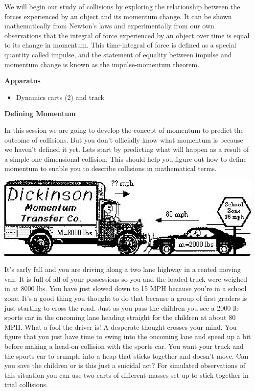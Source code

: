 We will begin our study of collisions by exploring the relationship between
the forces experienced by an object and its momentum change. It can be shown
mathematically from Newton's laws and experimentally from our own observations
that the integral of force experienced by an object over time is equal to its
change in momentum. This time-integral of force is defined as a special quantity
called impulse, and the statement of equality between impulse and momentum change
is known as the impulse-momentum theorem.

\textbf{Apparatus} 

\begin{itemize}
\item Dynamics carts (2) and track
\end{itemize}
\textbf{Defining Momentum }

In this session we are going to develop the concept of momentum to predict the
outcome of collisions. But you don't officially know what momentum is because
we haven't defined it yet. Lets start by predicting what will happen as a result
of a simple one-dimensional collision. This should help you figure out how to
define momentum to enable you to describe collisions in mathematical terms.

\vspace{0.3cm}
{\par\centering \includegraphics{momentum_fig1.eps} \par}
\vspace{0.3cm}

It's early fall and you are driving along a two lane highway in a rented moving
van. It is full of all of your possessions so you and the loaded truck were
weighed in at 8000 lbs. You have just slowed down to 15 MPH because you're in
a school zone. It's a good thing you thought to do that because a group of first
graders is just starting to cross the road. Just as you pass the children you
see a 2000 lb sports car in the oncoming lane heading straight for the children
at about 80 MPH. What a fool the driver is! A desperate thought crosses your
mind. You figure that you just have time to swing into the oncoming lane and
speed up a bit before making a head-on collision with the sports car. You want
your truck and the sports car to crumple into a heap that sticks together and
doesn't move. Can you save the children or is this just a suicidal act? For
simulated observations of this situation you can use two carts of different
masses set up to stick together in trial collisions. 

